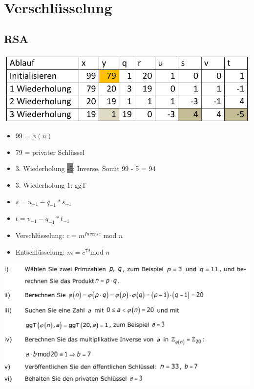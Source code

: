 
\section{Verschlüsselung}


\subsection{RSA}
\includegraphics[width=\linewidth]{graphic/extern-reto/RSA.png}
\begin{itemize}
    \item 99 = $\phi(n)$
    \item 79 = privater Schlüssel
    \item 3. Wiederholung \colorbox{gray}{-5}: Inverse, Somit 99 - 5 = 94
    \item 3. Wiederholung \colorbox{lightlightgrey}{1}: ggT
    \item $s = u_{-1} - q_{-1} * s_{-1}$
    \item $t = v_{-1} - q_{-1} * t_{-1}$
    \item Verschlüsselung: $c = m^{Inverse} $ mod $ n$
    \item Entschlüsselung: $m = c^{79}$mod $n$
\end{itemize}
\includegraphics[width=\linewidth]{graphic/extern-reto/RSASchritte.png}


\vfill
$$
\columnbreak
